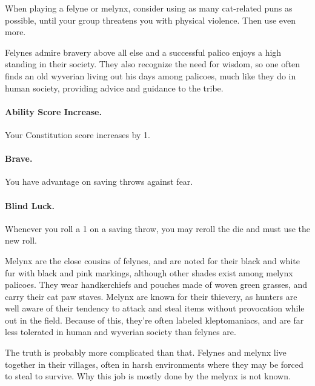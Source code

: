 When playing a felyne or melynx, consider using as many cat-related puns as possible, until your group threatens you with physical violence. Then use even more.

Felynes admire bravery above all else and a successful palico enjoys a high standing in their society. They also recognize the need for wisdom, so one often finds an old wyverian living out his days among palicoes, much like they do in human society, providing advice and guidance to the tribe.

\paragraph{Ability Score Increase.} Your Constitution score increases by 1.

\paragraph{Brave.} You have advantage on saving throws against fear.

\paragraph{Blind Luck.} Whenever you roll a 1 on a saving throw, you may reroll the die and must use the new roll.



Melynx are the close cousins of felynes, and are noted for their black and white fur with black and pink markings, although other shades exist among melynx palicoes.  They wear handkerchiefs and pouches made of woven green grasses, and carry their cat paw staves. Melynx are known for their thievery, as hunters are well aware of their tendency to attack and steal items without provocation while out in the field.  Because of this, they're often labeled kleptomaniacs, and are far less tolerated in human and wyverian society than felynes are.

The truth is probably more complicated than that. Felynes and melynx live together in their villages, often in harsh environments where they may be forced to steal to survive. Why this job is mostly done by the melynx is not known.

